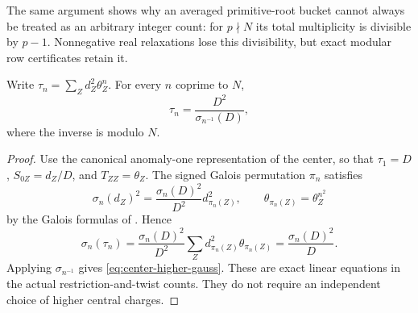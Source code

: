 The same argument shows why an averaged primitive-root bucket cannot
always be treated as an arbitrary integer count: for $p\nmid N$ its
total multiplicity is divisible by $p-1$. Nonnegative real relaxations
lose this divisibility, but exact modular row certificates retain it.

\begin{proposition}
\label{prop:center-higher-gauss}
Write $\tau_n=\sum_Z d_Z^2\theta_Z^n$. For every $n$ coprime to $N$,
\begin{equation}\label{eq:center-higher-gauss}
 \tau_n=\frac{D^2}{\sigma_{n^{-1}}(D)},
\end{equation}
where the inverse is modulo $N$.
\end{proposition}
\begin{proof}
Use the canonical anomaly-one representation of the center, so that
$\tau_1=D$, $S_{0Z}=d_Z/D$, and $T_{ZZ}=\theta_Z$.
The signed Galois permutation $\pi_n$ satisfies
\[
 \sigma_n(d_Z)^2=\frac{\sigma_n(D)^2}{D^2}d_{\pi_n(Z)}^2,
 \qquad \theta_{\pi_n(Z)}=\theta_Z^{n^2}
\]
by the Galois formulas of \cite[Theorem~II]{DLN}. Hence
\[
 \sigma_n(\tau_n)
 =\frac{\sigma_n(D)^2}{D^2}
     \sum_Zd_{\pi_n(Z)}^2\theta_{\pi_n(Z)}
 =\frac{\sigma_n(D)^2}{D}.
\]
Applying $\sigma_{n^{-1}}$ gives
\eqref{eq:center-higher-gauss}. These are exact linear equations in the
actual restriction-and-twist counts. They do not require an independent
choice of higher central charges.
\end{proof}
